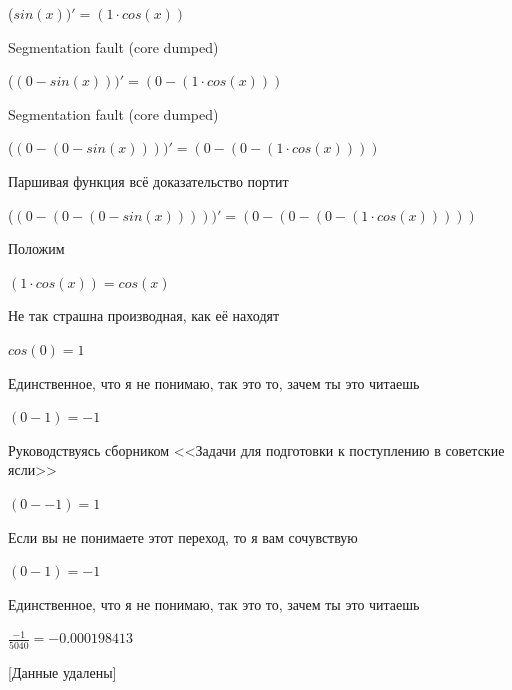 \documentclass[12pt,a4paper,fleqn]{article}
\begin{document}
\begin{center}
\begin{center}
\begin{center}
\begin{center}
\begin{center}
\begin{center}
\begin{center}
\begin{center}
\begin{center}
\begin{center}
\begin{center}
\begin{center}
\begin{center}
\begin{center}
\begin{center}
\begin{center}
\begin{center}
\begin{center}
\begin{center}
\begin{center}
\begin{center}
\begin{center}
\begin{center}
 ($sin(x))'
  = (1 \cdot cos(x))$\end{center}
Segmentation fault (core dumped)

\begin{center}
 ($(0-sin(x)))'
  = (0-(1 \cdot cos(x)))$\end{center}
Segmentation fault (core dumped)

\begin{center}
 ($(0-(0-sin(x))))'
  = (0-(0-(1 \cdot cos(x))))$\end{center}
Паршивая функция всё доказательство портит\cite{link2}

\begin{center}
 ($(0-(0-(0-sin(x)))))'
  = (0-(0-(0-(1 \cdot cos(x)))))$\end{center}
Положим

\begin{center}
$(1 \cdot cos(x)) = cos(x)$\end{center}
Не так страшна производная, как её находят\cite{link2}

\begin{center}
\begin{center}$cos(0) = 1$\end{center}
Единственное, что я не понимаю, так это то, зачем ты это читаешь

\begin{center}
\begin{center}$(0-1) = -1$\end{center}
Руководствуясь сборником <<Задачи для подготовки к поступлению в советские ясли>>\cite{link1}

\begin{center}
\begin{center}$(0--1) = 1$\end{center}
Если вы не понимаете этот переход, то я вам сочувствую

\begin{center}
\begin{center}$(0-1) = -1$\end{center}
Единственное, что я не понимаю, так это то, зачем ты это читаешь

\begin{center}
\begin{center}$\frac{-1}{5040} = -0.000198413$\end{center}
[Данные удалены]


\end{center}
\end{center}
\end{center}
\end{center}
\end{center}
\end{center}
\end{center}
\end{center}
\end{center}
\end{center}
\end{center}
\end{center}
\end{center}
\end{center}
\end{center}
\end{center}
\end{center}
\end{center}
\end{center}
\end{center}
\end{center}
\end{center}
\end{center}
\end{center}
\end{center}
\end{center}
\end{center}
\end{document}
